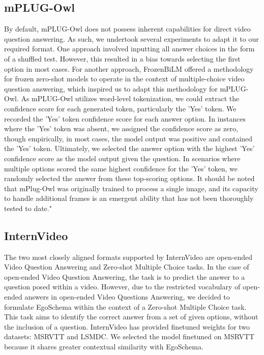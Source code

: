 \subsection{\textbf{mPLUG-Owl}}
By default, mPLUG-Owl does not possess inherent capabilities for direct video question answering. As such, we undertook several experiments to adapt it to our required format. One approach involved inputting all answer choices in the form of a shuffled test. However, this resulted in a bias towards selecting the first option in most cases. For another approach, FrozenBiLM offered a methodology for frozen zero-shot models to operate in the context of multiple-choice video question answering, which inspired us to adapt this methodology for mPLUG-Owl. As mPLUG-Owl utilizes word-level tokenization, we could extract the confidence score for each generated token, particularly the 'Yes' token. We recorded the 'Yes' token confidence score for each answer option. In instances where the 'Yes' token was absent, we assigned the confidence score as zero, though empirically, in most cases, the model output was positive and contained the 'Yes' token. Ultimately, we selected the answer option with the highest 'Yes' confidence score as the model output given the question. In scenarios where multiple options scored the same highest confidence for the 'Yes' token, we randomly selected the answer from these top-scoring options. It should be noted that mPlug-Owl was originally trained to process a single image, and its capacity to handle additional frames is an emergent ability that has not been thoroughly tested to date."
\subsection{\textbf{InternVideo}}
The two most closely aligned formats supported by InternVideo are open-ended Video Question Answering and Zero-shot Multiple Choice tasks. In the case of open-ended Video Question Answering, the task is to predict the answer to a question posed within a video. However, due to the restricted vocabulary of open-ended answers in open-ended Video Questions Answering, we decided to formulate EgoSchema within the context of a Zero-shot Multiple Choice task. This task aims to identify the correct answer from a set of given options, without the inclusion of a question. InternVideo has provided finetuned weights for two datasets: MSRVTT and LSMDC. We selected the model finetuned on MSRVTT because it shares greater contextual similarity with EgoSchema.
